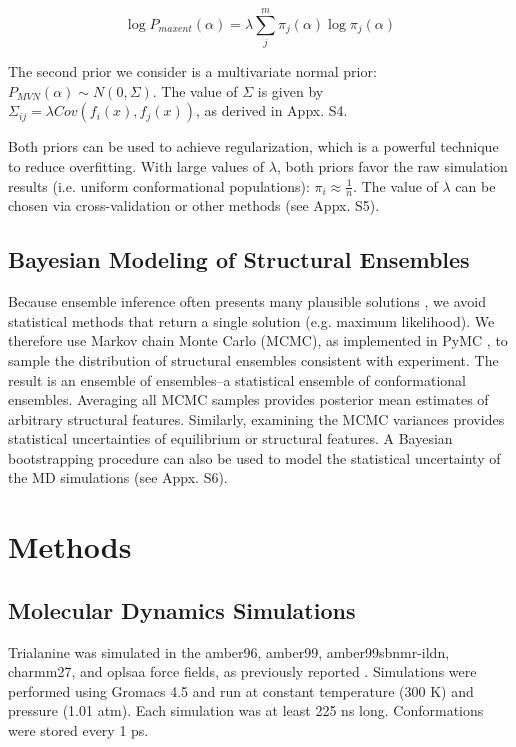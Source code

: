 \documentclass[11pt,titlepage]{article}
\begin{document}
$$\log P_{maxent}(\alpha) = \lambda \sum_j^m \pi_j(\alpha) \log \pi_j(\alpha)$$

The second prior we consider is a multivariate normal prior: $P_{MVN}(\alpha) \sim N(0, \Sigma)$.  The value of $\Sigma$ is given by $\Sigma_{ij} = \lambda Cov(f_i(x), f_j(x))$, as derived in Appx. S4.

Both priors can be used to achieve regularization, which is a powerful technique to reduce overfitting.  With large values of $\lambda$, both priors favor the raw simulation results (i.e. uniform conformational populations): $\pi_i \approx \frac{1}{n}$.  The value of $\lambda$ can be chosen via cross-validation or other methods (see Appx. S5).  

\subsection*{Bayesian Modeling of Structural Ensembles}

Because ensemble inference often presents many plausible solutions \citep{fisher2010, rieping2005}, we avoid statistical methods that return a single solution (e.g. maximum likelihood).  We therefore use Markov chain Monte Carlo (MCMC), as implemented in PyMC \citep{patil2010pymc}, to sample the distribution of structural ensembles consistent with experiment.  The result is an ensemble of ensembles--a statistical ensemble of conformational ensembles.  Averaging all MCMC samples provides posterior mean  estimates of arbitrary structural features.  Similarly, examining the MCMC variances provides statistical uncertainties of equilibrium or structural features.  A Bayesian bootstrapping procedure \citep{rubin1981} can also be used to model the statistical uncertainty of the MD simulations (see Appx. S6).

\section*{Methods}

\subsection*{Molecular Dynamics Simulations}

Trialanine was simulated in the amber96\citep{kollman1996}, amber99\citep{wang2000}, amber99sbnmr-ildn\citep{li2010}, charmm27\citep{mackerell2004extending,bjelkmar2010implementation}, and oplsaa\citep{kaminski2001evaluation} force fields, as previously reported \citep{beauchamp2012protein}.  Simulations were performed using Gromacs 4.5 \citep{hess2008} and run at constant temperature (300 K) and pressure (1.01 atm).  Each simulation was at least 225 ns long.  Conformations were stored every 1 ps.  
\end{document}
